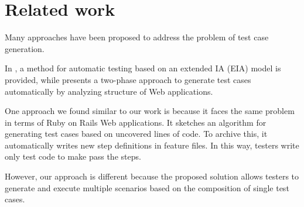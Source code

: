 \section{Related work}

Many approaches have been proposed to address the problem of test case generation.

In \cite{automated_test_case_ia}, a method for automatic testing based on an extended IA (EIA) model is provided, while \cite{novel_approach} presents a two-phase approach to generate test cases automatically by analyzing structure of Web applications.

One approach we found similar to our work is \cite{book:towards_paper} because it faces the same problem in terms of Ruby on Rails Web applications. It sketches an algorithm for generating test cases based on uncovered lines of code. To archive this, it automatically writes new step definitions in feature files. In this way, testers write only test code to make pass the steps.

However, our approach is different because the proposed solution allows testers to generate and execute multiple scenarios based on the composition of single test cases.